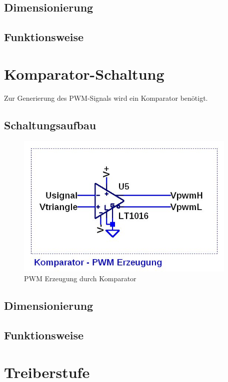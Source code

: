 \documentclass[11pt,a4paper,bibtotoc,oneside]{scrbook}
\begin{document}
\subsection{Dimensionierung}
\subsection{Funktionsweise}
\newpage
\section{Komparator-Schaltung}
Zur Generierung des PWM-Signals wird ein Komparator benötigt.
\subsection{Schaltungsaufbau}
    \begin{figure}[ht]
    \centering
        \includegraphics[width=300pt]{./picture/pwm.png}
        \caption{\label{lm324}{PWM Erzeugung durch Komparator}}
    \end{figure}
\subsection{Dimensionierung}
\subsection{Funktionsweise}
\section{Treiberstufe}
\end{document}
